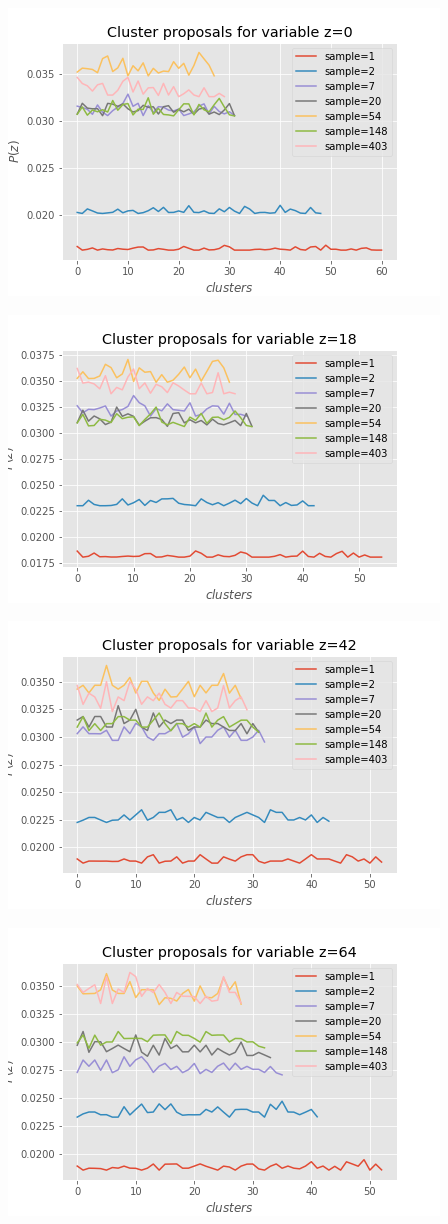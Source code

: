 \documentclass[]{article}
\begin{document}
	\begin{center}	
		\includegraphics[width=.6\textwidth]{task6/figures/T_3_1/Q2/sample_prob_0.png}
		
		\includegraphics[width=.6\textwidth]{task6/figures/T_3_1/Q2/sample_prob_18.png}
		
		\includegraphics[width=.6\textwidth]{task6/figures/T_3_1/Q2/sample_prob_42.png}
		
		\includegraphics[width=.6\textwidth]{task6/figures/T_3_1/Q2/sample_prob_64.png}
		

	\end{center}	
	
\end{document}
